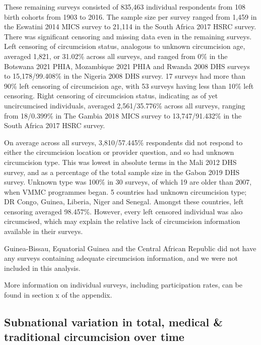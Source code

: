 \documentclass{article}
\begin{document}
These remaining surveys consisted of 835,463 individual respondents from 108 birth cohorts from 1903 to
2016. The sample size per survey ranged from 1,459 in the Eswatini 2014 MICS survey to 21,114 in the South
Africa 2017 HSRC survey.
There was significant censoring and missing data even in the remaining surveys. Left censoring of circumcision
status, analogous to unknown circumcision age, averaged 1,821, or 31.02\% across all surveys, and ranged from
0\% in the Botswana 2021 PHIA, Mozambique 2021 PHIA and Rwanda 2008 DHS surveys to 15,178/99.408\%
in the Nigeria 2008 DHS survey. 17 surveys had more than 90\% left censoring of circumcision age, with
53 surveys having less than 10\% left censoring. Right censoring of circumcision status, indicating as of yet
uncircumcised individuals, averaged 2,561/35.776\% across all surveys, ranging from 18/0.399\% in The
Gambia 2018 MICS survey to 13,747/91.432\% in the South Africa 2017 HSRC survey.

On average across all surveys, 3,810/57.445\% respondents did not respond to either the circumcision location
or provider question, and so had unknown circumcision type. This was lowest in absolute terms in the Mali 2012 DHS survey, and as a percentage of the total sample size in the Gabon 2019 DHS survey. 
Unknown type was 100\% in 30 surveys, of which 19 are older than 2007, when VMMC programmes began. 
5 countries had unknown circumcision type; DR Congo, Guinea, Liberia, Niger and Senegal. Amongst these countries,
left censoring averaged 98.457\%. However, every left censored individual was also circumcised, which may
explain the relative lack of circumcision information available in their surveys.

Guinea-Bissau, Equatorial Guinea and the Central African Republic did not have any surveys containing adequate circumcision information, and we were not included in this analysis.

More information on individual surveys, including participation rates, can be found in section x of the appendix. 

\subsection{Subnational variation in total, medical \& traditional circumcision over time}
\label{sec:org0d1ffe6}
\end{document}
